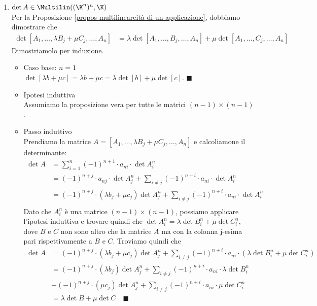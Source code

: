 \documentclass[11pt, a4paper, titlepage, oneside]{scrbook}
\begin{document}
\begin{enumerate}[label=\arabic*°]
    \item $\det A \in \Multilin((\K^n)^n, \K)$ \\
    Per la Proposizione \ref{propos-multilineareità-di-un-applicazione}, dobbiamo dimostrare che
    \begin{align*}
    \det [A_1, \ldots, \lambda B_j + \mu C_j, \ldots, A_n] &= \lambda \det [A_1, \ldots, B_j, \ldots, A_n] + \mu \det [A_1, \ldots, C_j, \ldots, A_n] 
    \end{align*}
    Dimostriamolo per induzione.
    \begin{itemize}
        \item Caso base: $n = 1$ \\
        $\det [\lambda b + \mu c] = \lambda b + \mu c = \lambda \det [b] + \mu \det[c]$. $\blacksquare$
        \item Ipotesi induttiva \\
        Assumiamo la proposizione vera per tutte le matrici $(n-1) \times (n-1)$.
        \item Passo induttivo \\
        Prendiamo la matrice $A = [A_1, \ldots, \lambda B_j + \mu C_j, \ldots, A_n]$ e calcoliamone il determinante:
        \begin{align*}
        \det A &= \sum_{i = 1}^n (-1)^{n+1} \cdot a_{ni} \cdot \det A^n_i  \\
         &= (-1)^{n + j} \cdot a_{nj} \cdot \det A^n_j + \sum_{i \neq j} (-1)^{n+i} \cdot a_{ni} \cdot \det A^n_i \\
         &= (-1)^{n+j} \cdot (\lambda b_j + \mu c_j) \det A^n_j + \sum_{i \neq j} (-1)^{n+i} \cdot a_{ni} \cdot \det A^n_i \\
        \end{align*}
        Dato che $A^n_i$ è una matrice $(n-1) \times (n-1)$, possiamo applicare l'ipotesi induttiva e trovare quindi che $\det A^n_i = \lambda \det B^n_i + \mu \det C^n_i$, dove $B$ e $C$ non sono altro che la matrice $A$ ma con la colonna j-esima pari rispettivamente a $B$ e $C$. Troviamo quindi che
        \begin{align*}
        \det A &= (-1)^{n+j} \cdot (\lambda b_j + \mu c_j) \det A^n_j + \sum_{i \neq j} (-1)^{n+i} \cdot a_{ni} \cdot (\lambda \det B^n_i + \mu \det C^n_i) \\
         &= (-1)^{n+j} \cdot (\lambda b_j) \det A^n_j + \sum_{i \neq j} (-1)^{n+i} \cdot a_{ni} \cdot \lambda \det B^n_i \\
         &+ (-1)^{n+j} \cdot (\mu c_j) \det A^n_j + \sum_{i \neq j} (-1)^{n+i} \cdot a_{ni} \cdot \mu \det C^n_i \\
         &= \lambda \det B + \mu \det C \quad \blacksquare 
        \end{align*}
    \end{itemize}


\end{enumerate}
\end{document}
